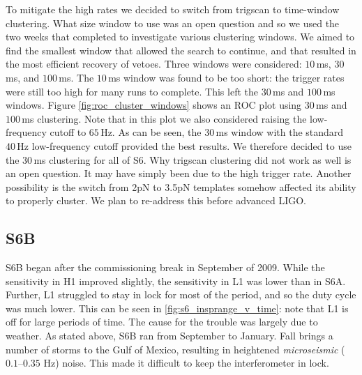 To mitigate the high rates we decided to switch from trigscan to time-window clustering. What size window to use was an open question and so we used the two weeks that completed to investigate various clustering windows. We aimed to find the smallest window that allowed the search to continue, and that resulted in the most efficient recovery of vetoes. Three windows were considered: $10\,$ms, $30\,$ms, and $100\,$ms. The $10\,$ms window was found to be too short: the trigger rates were still too high for many runs to complete. This left the $30\,$ms and $100\,$ms windows. Figure \ref{fig:roc_cluster_windows} shows an ROC plot using $30\,$ms and $100\,$ms clustering. Note that in this plot we also considered raising the low-frequency cutoff to $65\,$Hz. As can be seen, the $30\,$ms window with the standard $40\,$Hz low-frequency cutoff provided the best results. We therefore decided to use the $30\,$ms clustering for all of \ac{S6}. Why trigscan clustering did not work as well is an open question. It may have simply been due to the high trigger rate. Another possibility is the switch from 2\ac{pN} to 3.5\ac{pN} templates somehow affected its ability to properly cluster. We plan to re-address this before advanced \ac{LIGO}.


\subsection{S6B}

S6B began after the commissioning break in September of 2009. While the sensitivity in H1 improved slightly, the sensitivity in L1 was lower than in S6A. Further, L1 struggled to stay in lock for most of the period, and so the duty cycle was much lower. This can be seen in \ref{fig:s6_insprange_v_time}: note that L1 is off for large periods of time. The cause for the trouble was largely due to weather. As stated above, S6B ran from September to January. Fall brings a number of storms to the Gulf of Mexico, resulting in heightened \emph{microseismic} ($0.1$--$0.35$ Hz) noise. This made it difficult to keep the interferometer in lock.

